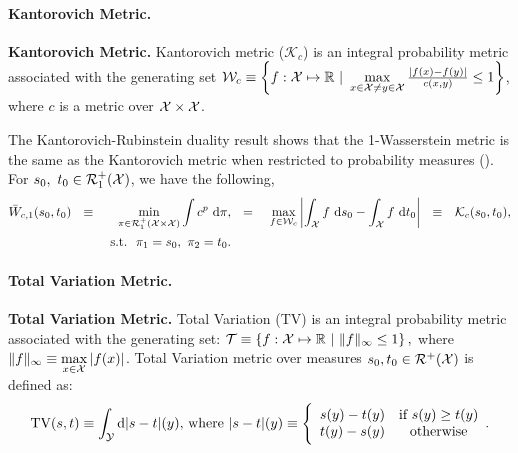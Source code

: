 \paragraph{Kantorovich Metric.}
\begin{definitionBox}
\begin{definition}{\textbf{Kantorovich Metric.}}\newline
Kantorovich metric ($\mathcal{K}_c$) is an integral probability metric associated with the generating set $\mathcal{W}_c\equiv \left\{ f:\mathcal{X}\mapsto \mathbb{R} ~|~ \max\limits_{x\in\mathcal{X}\neq y\in\mathcal{X}} \frac{|f(x)-f(y)|}{c(x, y)} \leq 1 \right\}$, where $c$ is a metric over $\mathcal{X} \times \mathcal{X}$.  
\end{definition}
\end{definitionBox}
The Kantorovich-Rubinstein duality result shows that the 1-Wasserstein metric is the same as the Kantorovich metric when restricted to probability measures (\citep[(5.11)]{villanioldnew}). For $s_0,\ t_0\in\mathcal{R}^+_1(\mathcal{X})$, we have the following,
\begin{align*}\label{eqn:koteqdual}
\bar{W}_{c,1}(s_0,t_0)&\ \ \equiv&\min\limits_{\pi\in\calR^+_1(\calX\times\calX)}\int c^p\ \textup{d}\pi, &\ \ =\ &\max\limits_{f\in\calW_c}\left|\int_\calX f\ \textup{d}s_0-\int_\calX f\ \textup{d}t_0\right|&\ \ \equiv&\calK_c(s_0,t_0),\\
&&\textup{ s.t.}\ \ \pi_1=s_0,\ \pi_2=t_0.
\end{align*}
\paragraph{Total Variation Metric.}
\begin{definitionBox}
    \begin{definition}{\textbf{Total Variation Metric.}}\newline
        Total Variation (TV) is an integral probability metric associated with the generating set: $\mathcal{T}\equiv\left\{f:\calX\mapsto\R\ |\ \|f\|_\infty\le1\right\},$ where $\|f\|_\infty\equiv\max\limits_{x\in\mathcal{X}}|f(x)|$. Total Variation metric over measures $s_0, t_0\in \mathcal{R}^+(\mathcal{X})$ is defined as:
\vspace{-0.17in}
\begin{equation*}\textup{TV}(s, t)\equiv \int_{\mathcal{Y}} \textup{d} |s-t|(y)\textup{, where }|s-t|(y)\equiv\Bigg\{\begin{array}{cc}
    s(y)-t(y) & \textup{if } s(y)\ge t(y) \\
    t(y)-s(y) & \textup{otherwise}
\end{array}.        
\end{equation*}
    \end{definition}
\end{definitionBox}

